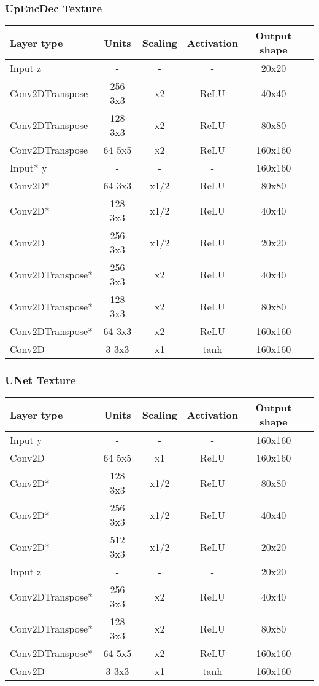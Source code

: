 \begin{table*}[!h]
\subsubsection{UpEncDec Texture}
{
	\centering
	\begin{tabular}{|l|c|c|c|c|c|}
		\hline
		Layer type & Units & Scaling & Activation & Output shape\\
		\hline
		Input z & - & - & - & 20x20 \\
		Conv2DTranspose & 256 3x3 & x2 & ReLU & 40x40 \\
		Conv2DTranspose & 128 3x3 & x2 & ReLU & 80x80 \\
		Conv2DTranspose & 64 5x5 & x2 & ReLU & 160x160 \\
		Input* y & - & - & - & 160x160\\
		Conv2D* & 64 3x3 & x1/2 & ReLU & 80x80 \\
		Conv2D* & 128 3x3 & x1/2 & ReLU & 40x40 \\
		Conv2D & 256 3x3 & x1/2 & ReLU & 20x20 \\
		Conv2DTranspose* & 256 3x3 & x2 & ReLU & 40x40 \\
		Conv2DTranspose* & 128 3x3 & x2 & ReLU & 80x80 \\
		Conv2DTranspose* & 64 3x3 & x2 & ReLU & 160x160 \\
		Conv2D & 3 3x3 & x1 & tanh & 160x160 \\
		\hline
	\end{tabular}
}

\subsubsection{UNet Texture}
{
	\centering
	\begin{tabular}{|l|c|c|c|c|c|}
		\hline
		Layer type & Units & Scaling & Activation & Output shape\\
		\hline
		Input y & - & - & - & 160x160\\
		Conv2D & 64 5x5 & x1 & ReLU & 160x160 \\
		Conv2D* & 128 3x3 & x1/2 & ReLU & 80x80 \\
		Conv2D* & 256 3x3 & x1/2 & ReLU & 40x40 \\
		Conv2D* & 512 3x3 & x1/2 & ReLU & 20x20 \\
		Input z & - & - & - & 20x20 \\
		Conv2DTranspose* & 256 3x3 & x2 & ReLU & 40x40 \\
		Conv2DTranspose* & 128 3x3 & x2 & ReLU & 80x80 \\
		Conv2DTranspose* & 64 5x5 & x2 & ReLU & 160x160 \\
		Conv2D & 3 3x3 & x1 & tanh & 160x160 \\
		\hline
	\end{tabular}
}


\end{table*}
